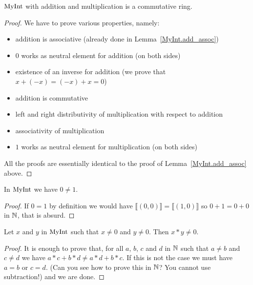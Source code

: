 \begin{proposition}
    \label{MyInt.commRing}
    \leanok
    $\mathrm{MyInt}$ with addition and multiplication is a commutative ring.
\end{proposition}
\begin{proof}
    \leanok
    We have to prove various properties, namely:
    \begin{itemize}
        \item addition is associative (already done in Lemma~\ref{MyInt.add_assoc})
        \item $0$ works as neutral element for addition (on both sides)
        \item existence of an inverse for addition (we prove that $x + (-x) = (-x) + x = 0$)
        \item addition is commutative
        \item left and right distributivity of multiplication with respect to addition
        \item associativity of multiplication
        \item $1$ works as neutral element for multiplication (on both sides)
    \end{itemize}
    All the proofs are essentially identical to the proof of Lemma~\ref{MyInt.add_assoc} above.
\end{proof}

\begin{lemma}
    \label{MyInt.zero_ne_one}
    \leanok
In $\mathrm{MyInt}$ we have $0 \neq 1$.
\end{lemma}
\begin{proof}
    \leanok
    If $0 = 1$ by definition we would have $⟦ (0,0) ⟧ = ⟦ (1,0) ⟧$
    so $0+1=0+0$ in $\mathbb{N}$, that is absurd.
\end{proof}

\begin{lemma}
    \label{MyInt.mul_ne_zero}
    \leanok
Let $x$ and $y$ in $\mathrm{MyInt}$ such that $x \neq 0$ and $y \neq 0$. Then $x*y \neq 0$.
\end{lemma}
\begin{proof}
    \leanok
    It is enough to prove that, for all $a$, $b$, $c$ and $d$ in $\mathbb{N}$ such that $a \neq b$ and $c \neq d$ we have $a*c+b*d\neq a*d+b*c$. If this is not the case we must have $a = b$ or $c = d$. (Can you see how to prove this in $\mathbb{N}$? You cannot use subtraction!) and we are done.
\end{proof}

